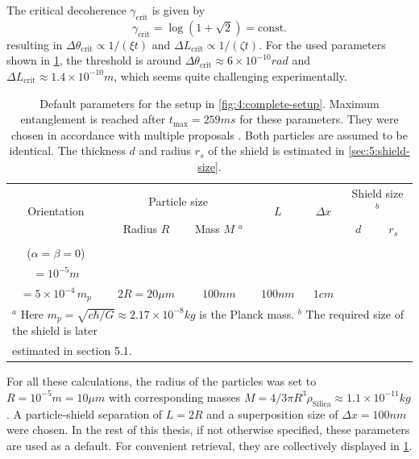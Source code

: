 The critical decoherence $\gamma_\mathrm{crit}$ is given by
\begin{equation}\label{eq:4:critical-point}
  \gamma_\mathrm{crit} = \log(1 + \sqrt{2}) = \mathrm{const.}
\end{equation}
resulting in $\Delta\theta_\mathrm{crit} \propto 1/(\xi t)$ and $\Delta L_\mathrm{crit} \propto 1/(\zeta t)$. 
For the used parameters shown in \cref{tab:paramters}, the threshold is around $\Delta \theta_\mathrm{crit} \approx 6 \times 10^{-10} \si{rad}$ and $\Delta L_\mathrm{crit} \approx 1.4 \times 10^{-10} \si{m}$, which seems quite challenging experimentally.
\begin{table}[!t]
  \centering
  \begin{adjustbox}{max width=\textwidth}
    \begin{tabularx}{\textwidth}{c c c c c c c}
      \toprule
      \multirow{2}{*}{Orientation} & \multicolumn{2}{c}{Particle size} & \multirow{2}{*}{$L$} & \multirow{2}{*}{$\Delta x$} & \multicolumn{2}{c}{Shield size $^b$} \\ \cline{2-3} \cline{6-7}
      & Radius $R$ & Mass $M$ $^a$ & & & $d$ & $r_s$\\
      \midrule
      \begin{tabular}{@{}c@{}}Parallel \\ ($\alpha=\beta=0$) \end{tabular} & \begin{tabular}{@{}c@{}}$10\si{\mu m}$ \\ $=10^{-5}\si{m}$\end{tabular} & \begin{tabular}{@{}c@{}}$\approx 10^{-11}\si{kg}$ \\ $=5\times 10^{-4} \, m_p$\end{tabular} & $2R=20\si{\mu m}$ & $100\si{nm}$ & $100\si{nm}$ & $1\si{cm}$ \\
      \bottomrule
      \multicolumn{7}{l}{\footnotesize $^a$ Here $m_p = \sqrt{c\hbar/G}\approx 2.17\times 10^{-8}\si{kg}$ is the Planck mass. $^b$ The required size of the shield is later} \\[-4pt]
      \multicolumn{7}{l}{\footnotesize estimated in section 5.1.} \\[5pt]
    \end{tabularx}
  \end{adjustbox}
  \caption{Default parameters for the setup in \cref{fig:4:complete-setup}. Maximum entanglement is reached after $t_\mathrm{max} = 259\si{ms}$ for these parameters. They were chosen in accordance with multiple proposals \cite{Aspelmeyer_2024,Rijavec_2021}. Both particles are assumed to be identical. The thickness $d$ and radius $r_s$ of the shield is estimated in \cref{sec:5:shield-size}.}
  \label{tab:paramters}
\end{table}
For all these calculations, the radius of the particles was set to $R=10^{-5}\si{m} = 10\si{\mu m}$ with corresponding masses $M=4/3 \pi R^3 \rho_\mathrm{Silica} \approx 1.1\times 10^{-11}\si{kg}$.
A particle-shield separation of $L=2R$ and a superposition size of $\Delta x = 100\si{nm}$ were chosen. In the rest of this thesis, if not otherwise specified, these parameters are used as a default.
For convenient retrieval, they are collectively displayed in \cref{tab:paramters}.

